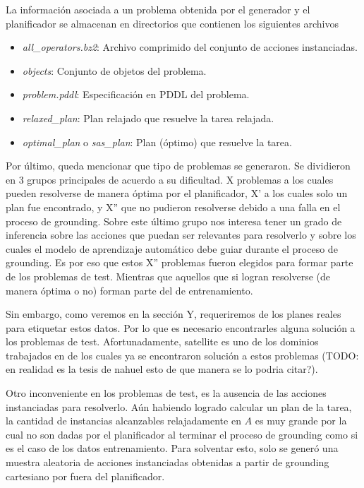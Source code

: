 La información asociada a un problema obtenida por el generador y el
planificador se almacenan en directorios que contienen los siguientes archivos

\begin{itemize}
    \item \emph{all\_operators.bz2}: Archivo comprimido del conjunto de acciones
    instanciadas.
    \item \emph{objects}: Conjunto de objetos del problema.
    \item \emph{problem.pddl}: Especificación en PDDL del problema.
    \item \emph{relaxed\_plan}: Plan relajado que resuelve la tarea relajada.
    \item \emph{optimal\_plan} o \emph{sas\_plan}: Plan (óptimo) que resuelve la
    tarea.
\end{itemize}

Por último, queda mencionar que tipo de problemas se generaron. Se dividieron en
3 grupos principales de acuerdo a su dificultad. X problemas a los cuales pueden
resolverse de manera óptima por el planificador, X' a los cuales solo un plan
fue encontrado, y X'' que no pudieron resolverse debido a una falla en el
proceso de grounding. Sobre este último grupo nos interesa tener un grado de
inferencia sobre las acciones que puedan ser relevantes para resolverlo y sobre
los cuales el modelo de aprendizaje automático debe guiar durante el proceso de
grounding. Es por eso que estos X'' problemas fueron elegidos para formar parte
de los problemas de test. Mientras que aquellos que si logran resolverse (de
manera óptima o no) forman parte del de entrenamiento.

Sin embargo, como veremos en la sección Y, requeriremos de los planes reales
para etiquetar estos datos. Por lo que es necesario encontrarles alguna solución
a los problemas de test. Afortunadamente, satellite es uno de los dominios
trabajados en \citep{Gnad_Torralba_Dominguez_Areces_Bustos_2019} de los cuales
ya se encontraron solución a estos problemas (TODO: en realidad es la tesis de
nahuel esto de que manera se lo podria citar?).

Otro inconveniente en los problemas de test, es la ausencia de las acciones
instanciadas para resolverlo. Aún habiendo logrado calcular un plan de la tarea,
la cantidad de instancias alcanzables relajadamente en $A$ es muy grande por la
cual no son dadas por el planificador al terminar el proceso de grounding como
si es el caso de los datos entrenamiento. Para solventar esto, solo se generó
una muestra aleatoria de acciones instanciadas obtenidas a partir de grounding
cartesiano por fuera del planificador.

